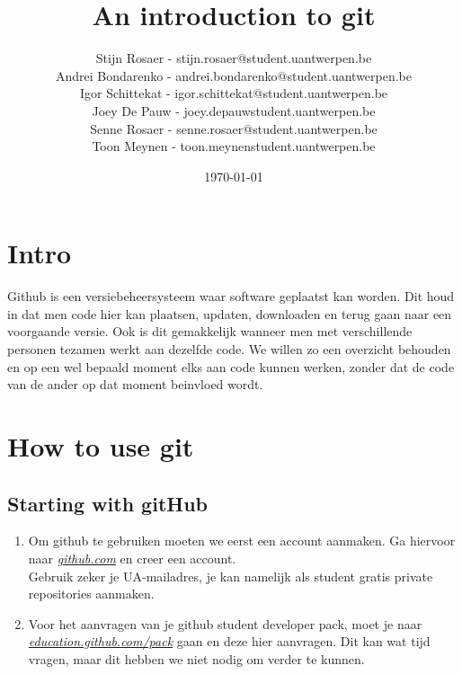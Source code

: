 \documentclass[a4paper]{article}
\begin{document}
	\title{An introduction to git}
	\date{\today}

	\author{Stijn Rosaer - stijn.rosaer@student.uantwerpen.be\\
	Andrei Bondarenko - andrei.bondarenko@student.uantwerpen.be\\
		Igor Schittekat - igor.schittekat@student.uantwerpen.be\\
	Joey De Pauw - joey.depauwstudent.uantwerpen.be\\
	Senne Rosaer - senne.rosaer@student.uantwerpen.be\\
	Toon Meynen - toon.meynenstudent.uantwerpen.be
	}
	\maketitle
	
	
	\section{Intro}
		Github is een versiebeheersysteem waar software geplaatst kan worden. Dit houd in dat men code hier kan plaatsen, updaten, downloaden en terug gaan naar een voorgaande versie. Ook is dit gemakkelijk wanneer men met verschillende personen tezamen werkt aan dezelfde code. We willen zo een overzicht behouden en op een wel bepaald moment elks aan code kunnen werken, zonder dat de code van de ander op dat moment beinvloed wordt.
	
	\pagebreak
	
	\section{How to use git}
		\subsection{Starting with gitHub}
			\begin{enumerate}
				\item Om github te gebruiken moeten we eerst een account aanmaken. Ga hiervoor naar \href{https://github.com/}{\textit{github.com}} en creer een account.\\	
				Gebruik zeker je UA-mailadres, je kan namelijk als student gratis private repositories aanmaken.
				\item Voor het aanvragen van je github student developer pack, moet je naar  \href{https://education.github.com/pack}{\textit{education.github.com/pack}} gaan en deze hier aanvragen. Dit kan wat tijd vragen, maar dit hebben we niet nodig om verder te kunnen.
			\end{enumerate}
\end{document}

